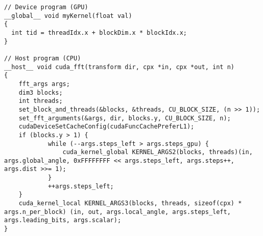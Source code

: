 \lstset{language=C++}
\begin{lstlisting}
// Device program (GPU)
__global__ void myKernel(float val)
{
  int tid = threadIdx.x + blockDim.x * blockIdx.x;
}

// Host program (CPU)
__host__ void cuda_fft(transform dir, cpx *in, cpx *out, int n)
{
    fft_args args;
    dim3 blocks;
    int threads;
    set_block_and_threads(&blocks, &threads, CU_BLOCK_SIZE, (n >> 1));
    set_fft_arguments(&args, dir, blocks.y, CU_BLOCK_SIZE, n);
    cudaDeviceSetCacheConfig(cudaFuncCachePreferL1);
    if (blocks.y > 1) {
            while (--args.steps_left > args.steps_gpu) {
                cuda_kernel_global KERNEL_ARGS2(blocks, threads)(in, args.global_angle, 0xFFFFFFFF << args.steps_left, args.steps++, args.dist >>= 1);
            }
            ++args.steps_left;
    }
    cuda_kernel_local KERNEL_ARGS3(blocks, threads, sizeof(cpx) * args.n_per_block) (in, out, args.local_angle, args.steps_left, args.leading_bits, args.scalar);
}
\end{lstlisting}